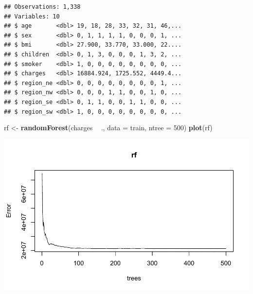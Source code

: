 \documentclass[openany]{book}
\newenvironment{Shaded}{\begin{snugshade}}{\end{snugshade}}
\newcommand{\DataTypeTok}[1]{\textcolor[rgb]{0.13,0.29,0.53}{#1}}
\newcommand{\DecValTok}[1]{\textcolor[rgb]{0.00,0.00,0.81}{#1}}
\newcommand{\FloatTok}[1]{\textcolor[rgb]{0.00,0.00,0.81}{#1}}
\newcommand{\KeywordTok}[1]{\textcolor[rgb]{0.13,0.29,0.53}{\textbf{#1}}}
\newcommand{\NormalTok}[1]{#1}
\newcommand{\OperatorTok}[1]{\textcolor[rgb]{0.81,0.36,0.00}{\textbf{#1}}}
\newcommand{\StringTok}[1]{\textcolor[rgb]{0.31,0.60,0.02}{#1}}
\begin{document}
\begin{verbatim}
## Observations: 1,338
## Variables: 10
## $ age       <dbl> 19, 18, 28, 33, 32, 31, 46,...
## $ sex       <dbl> 0, 1, 1, 1, 1, 0, 0, 0, 1, ...
## $ bmi       <dbl> 27.900, 33.770, 33.000, 22....
## $ children  <dbl> 0, 1, 3, 0, 0, 0, 1, 3, 2, ...
## $ smoker    <dbl> 1, 0, 0, 0, 0, 0, 0, 0, 0, ...
## $ charges   <dbl> 16884.924, 1725.552, 4449.4...
## $ region_ne <dbl> 0, 0, 0, 0, 0, 0, 0, 0, 1, ...
## $ region_nw <dbl> 0, 0, 0, 1, 1, 0, 0, 1, 0, ...
## $ region_se <dbl> 0, 1, 1, 0, 0, 1, 1, 0, 0, ...
## $ region_sw <dbl> 1, 0, 0, 0, 0, 0, 0, 0, 0, ...
\end{verbatim}

\begin{Shaded}
\end{Shaded}

\begin{Shaded}
\begin{Highlighting}[]
\NormalTok{rf <-}\StringTok{ }\KeywordTok{randomForest}\NormalTok{(charges }\OperatorTok{~}\StringTok{ }\NormalTok{., }\DataTypeTok{data =}\NormalTok{ train, }\DataTypeTok{ntree =} \DecValTok{500}\NormalTok{)}
\KeywordTok{plot}\NormalTok{(rf)}
\end{Highlighting}
\end{Shaded}

\includegraphics{06-tree-based-models_files/figure-latex/unnamed-chunk-14-1.pdf}
\end{document}
